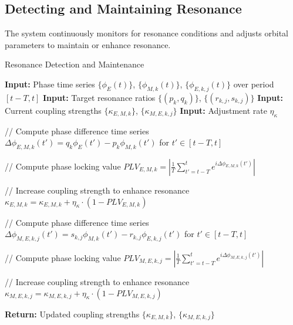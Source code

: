 \subsection{Detecting and Maintaining Resonance}

The system continuously monitors for resonance conditions and adjusts orbital parameters to maintain or enhance resonance.

\begin{algorithm}
\caption{Resonance Detection and Maintenance}
\begin{algorithmic}[1]
\State \textbf{Input:} Phase time series $\{\phi_E(t)\}$, $\{\phi_{M,k}(t)\}$, $\{\phi_{E,k,j}(t)\}$ over period $[t-T, t]$
\State \textbf{Input:} Target resonance ratios $\{(p_k,q_k)\}$, $\{(r_{k,j},s_{k,j})\}$
\State \textbf{Input:} Current coupling strengths $\{\kappa_{E,M,k}\}$, $\{\kappa_{M,E,k,j}\}$
\State \textbf{Input:} Adjustment rate $\eta_{\kappa}$

    \State // Compute phase difference time series
    \State $\Delta\phi_{E,M,k}(t') = q_k\phi_E(t') - p_k\phi_{M,k}(t')$ for $t' \in [t-T, t]$
    
    \State // Compute phase locking value
    \State $PLV_{E,M,k} = \left| \frac{1}{T} \sum_{t'=t-T}^{t} e^{i\Delta\phi_{E,M,k}(t')} \right|$
    
        \State // Increase coupling strength to enhance resonance
        \State $\kappa_{E,M,k} = \kappa_{E,M,k} + \eta_{\kappa} \cdot (1 - PLV_{E,M,k})$
    \EndIf
    
        \State // Compute phase difference time series
        \State $\Delta\phi_{M,E,k,j}(t') = s_{k,j}\phi_{M,k}(t') - r_{k,j}\phi_{E,k,j}(t')$ for $t' \in [t-T, t]$
        
        \State // Compute phase locking value
        \State $PLV_{M,E,k,j} = \left| \frac{1}{T} \sum_{t'=t-T}^{t} e^{i\Delta\phi_{M,E,k,j}(t')} \right|$
        
            \State // Increase coupling strength to enhance resonance
            \State $\kappa_{M,E,k,j} = \kappa_{M,E,k,j} + \eta_{\kappa} \cdot (1 - PLV_{M,E,k,j})$
        \EndIf
    \EndFor
\EndFor

\State \textbf{Return:} Updated coupling strengths $\{\kappa_{E,M,k}\}$, $\{\kappa_{M,E,k,j}\}$
\end{algorithmic}
\end{algorithm}

